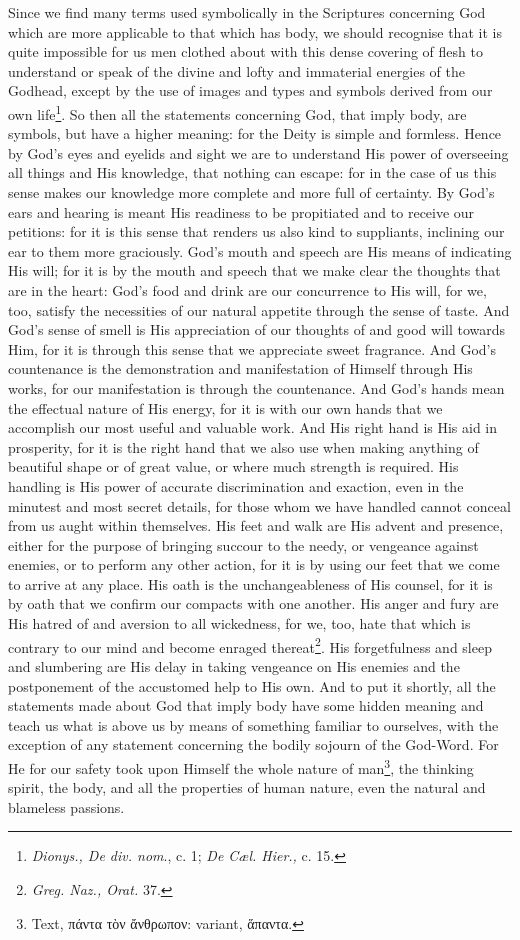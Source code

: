 Since we find many terms used symbolically in the Scriptures concerning God which are more applicable to that which has body, we should recognise that it is quite impossible for us men clothed about with this dense covering of flesh to understand or speak of the divine and lofty and immaterial energies of the Godhead, except by the use of images and types and symbols derived from our own life\footnote{\emph{Dionys., De div. nom}., c. 1; \emph{De Cæl. Hier., }c. 15.}. So then all the statements concerning God, that imply body, are symbols, but have a higher meaning: for the Deity is simple and formless. Hence by God’s eyes and eyelids and sight we are to understand His power of overseeing all things and His knowledge, that nothing can escape: for in the case of us this sense makes our knowledge more complete and more full of certainty. By God’s ears and hearing is meant His readiness to be propitiated and to receive our petitions: for it is this sense that renders us also kind to suppliants, inclining our ear to them more graciously. God’s mouth and speech are His means of indicating His will; for it is by the mouth and speech that we make clear the thoughts that are in the heart: God’s food and drink are our concurrence to His will, for we, too, satisfy the necessities of our natural appetite through the sense of taste. And God’s sense of smell is His appreciation of our thoughts of and good will towards Him, for it is through this sense that we appreciate sweet fragrance. And God’s countenance is the demonstration and manifestation of Himself through His works, for our manifestation is through the countenance. And God’s hands mean the effectual nature of His energy, for it is with our own hands that we accomplish our most useful and valuable work. And His right hand is His aid in prosperity, for it is the right hand that we also use when making anything of beautiful shape or of great value, or where much strength is required. His handling is His power of accurate discrimination and exaction, even in the minutest and most secret details, for those whom we have handled cannot conceal from us aught within themselves. His feet and walk are His advent and presence, either for the purpose of bringing succour to the needy, or vengeance against enemies, or to perform any other action, for it is by using our feet that we come to arrive at any place. His oath is the unchangeableness of His counsel, for it is by oath that we confirm our compacts with one another. His anger and fury are His hatred of and aversion to all wickedness, for we, too, hate that which is contrary to our mind and become enraged thereat\footnote{\emph{Greg. Naz., Orat. }37.}. His forgetfulness and sleep and slumbering are His delay in taking vengeance on His enemies and the postponement of the accustomed help to His own. And to put it shortly, all the statements made about God that imply body have some hidden meaning and teach us what is above us by means of something familiar to ourselves, with the exception of any statement concerning the bodily sojourn of the God-Word. For He for our safety took upon Himself the whole nature of man\footnote{Text, \textgreek{πάντα τὸν ἄνθρωπον}: variant, \textgreek{ἅπαντα}.}, the thinking spirit, the body, and all the properties of human nature, even the natural and blameless passions.

